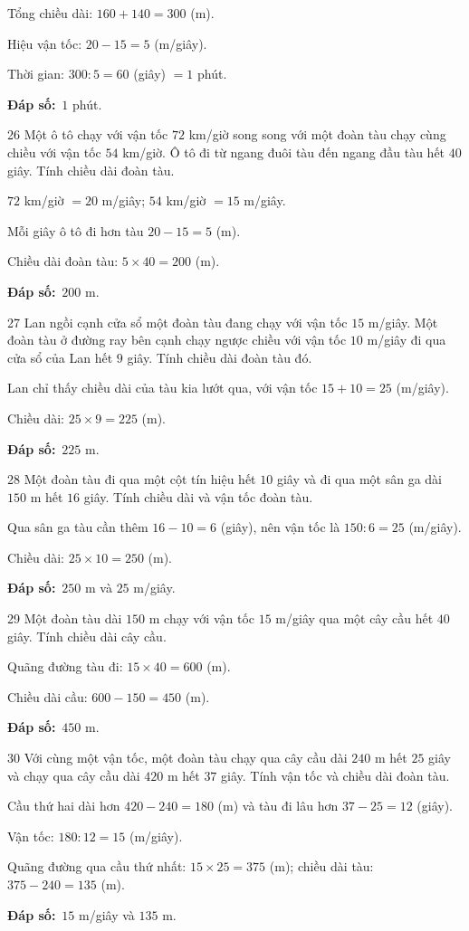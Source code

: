 \documentclass[11pt]{article}
\newif\ifsol \solfalse
\providecommand{\AnsWord}{Đáp số}
\newcommand{\dapso}[1]{\par\textbf{\AnsWord:}\ #1}
\newcommand{\probsol}[1]{%
  \begin{lrbox}{\solmeasure}\begin{minipage}{\dimexpr\linewidth-24pt\relax}#1\end{minipage}\end{lrbox}%
  \ifsol
    \begin{solbox}#1\end{solbox}%
  \else
    \setlength{\solht}{\dimexpr\ht\solmeasure+\dp\solmeasure+0.85cm\relax}%
    \ifdim\solht<1.35cm\setlength{\solht}{1.35cm}\fi
    \begin{tcolorbox}[colback=white,colframe=Line,boxrule=0.8pt,arc=5pt,
      left=8pt,right=8pt,top=4pt,bottom=4pt,height=\solht]{\footnotesize\color{Slate}\itshape\WorkWord}\end{tcolorbox}%
  \fi}
\newcommand{\gap}{\vspace{0.3cm}}
\def\WorkWord{Bài làm:}
\def\AnsWord{Đáp số}
\begin{document}
\probsol{
Tổng chiều dài: $160+140=300$ (m).\par Hiệu vận tốc: $20-15=5$ (m/giây).\par Thời gian: $300:5=60$ (giây) $=1$ phút.
\dapso{$1$ phút.}}
\gap
\begin{probbox}{26}{\relax}
Một ô tô chạy với vận tốc $72$ km/giờ song song với một đoàn tàu chạy cùng chiều với vận tốc $54$ km/giờ. Ô tô đi từ ngang đuôi tàu đến ngang đầu tàu hết $40$ giây. Tính chiều dài đoàn tàu.
\end{probbox}
\probsol{
$72$ km/giờ $=20$ m/giây; $54$ km/giờ $=15$ m/giây.\par Mỗi giây ô tô đi hơn tàu $20-15=5$ (m).\par Chiều dài đoàn tàu: $5\times40=200$ (m).
\dapso{$200$ m.}}
\gap
\begin{probbox}{27}{\relax}
Lan ngồi cạnh cửa sổ một đoàn tàu đang chạy với vận tốc $15$ m/giây. Một đoàn tàu ở đường ray bên cạnh chạy ngược chiều với vận tốc $10$ m/giây đi qua cửa sổ của Lan hết $9$ giây. Tính chiều dài đoàn tàu đó.
\end{probbox}
\probsol{
Lan chỉ thấy chiều dài của tàu kia lướt qua, với vận tốc $15+10=25$ (m/giây).\par Chiều dài: $25\times9=225$ (m).
\dapso{$225$ m.}}
\gap
\begin{probbox}{28}{\relax}
Một đoàn tàu đi qua một cột tín hiệu hết $10$ giây và đi qua một sân ga dài $150$ m hết $16$ giây. Tính chiều dài và vận tốc đoàn tàu.
\end{probbox}
\probsol{
Qua sân ga tàu cần thêm $16-10=6$ (giây), nên vận tốc là $150:6=25$ (m/giây).\par Chiều dài: $25\times10=250$ (m).
\dapso{$250$ m và $25$ m/giây.}}
\gap
\begin{probbox}{29}{\relax}
Một đoàn tàu dài $150$ m chạy với vận tốc $15$ m/giây qua một cây cầu hết $40$ giây. Tính chiều dài cây cầu.
\end{probbox}
\probsol{
Quãng đường tàu đi: $15\times40=600$ (m).\par Chiều dài cầu: $600-150=450$ (m).
\dapso{$450$ m.}}
\gap
\begin{probbox}{30}{\relax}
Với cùng một vận tốc, một đoàn tàu chạy qua cây cầu dài $240$ m hết $25$ giây và chạy qua cây cầu dài $420$ m hết $37$ giây. Tính vận tốc và chiều dài đoàn tàu.
\end{probbox}
\probsol{
Cầu thứ hai dài hơn $420-240=180$ (m) và tàu đi lâu hơn $37-25=12$ (giây).\par
Vận tốc: $180:12=15$ (m/giây).\par Quãng đường qua cầu thứ nhất: $15\times25=375$ (m); chiều dài tàu: $375-240=135$ (m).
\dapso{$15$ m/giây và $135$ m.}}
\end{document}
